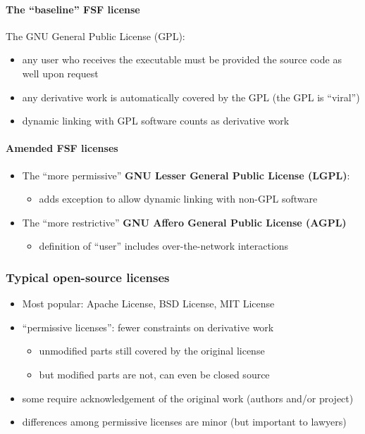 \documentclass[12pt]{article}
\begin{document}
\paragraph{The ``baseline'' FSF license}
The GNU General Public License (GPL):
\begin{itemize}
  \item any user who receives the executable must be provided the source code as well upon request
  \item any derivative work is automatically covered by the GPL (the GPL is ``viral'')
  \item dynamic linking with GPL software counts as derivative work
\end{itemize}


\paragraph{Amended FSF licenses}

\begin{itemize}
  \item The ``more permissive'' \textbf{GNU Lesser General Public License (LGPL)}:
  \begin{itemize}
    \item adds exception to allow dynamic linking with non-GPL software
  \end{itemize}
  
  \item The ``more restrictive'' \textbf{GNU Affero General Public License (AGPL)}
  \begin{itemize}
    \item definition of ``user'' includes over-the-network interactions
  \end{itemize}
\end{itemize}

\subsubsection{Typical open-source licenses}

\begin{itemize}
  \item Most popular: Apache License, BSD License, MIT License
  \item ``permissive licenses'': fewer constraints on derivative work
  \begin{itemize}
    \item unmodified parts still covered by the original license
    \item but modified parts are not, can even be closed source
  \end{itemize}
  \item some require acknowledgement of the original work (authors and/or project)
  \item differences among permissive licenses are minor (but important to lawyers)
\end{itemize}
\end{document}
